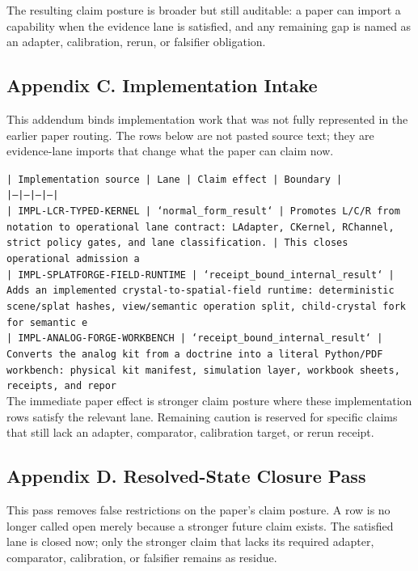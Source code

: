 \documentclass[11pt]{article}
\begin{document}
The resulting claim posture is broader but still auditable: a paper can import a capability when the evidence lane is satisfied, and any remaining gap is named as an adapter, calibration, rerun, or falsifier obligation.

\subsection*{Appendix C. Implementation Intake}

This addendum binds implementation work that was not fully represented in the earlier paper routing. The rows below are not pasted source text; they are evidence-lane imports that change what the paper can claim now.

\noindent\texttt{| Implementation source | Lane | Claim effect | Boundary |}\\
\noindent\texttt{|---|---|---|---|}\\
\noindent\texttt{| IMPL-LCR-TYPED-KERNEL | `normal\_form\_result` | Promotes L/C/R from notation to operational lane contract: LAdapter, CKernel, RChannel, strict policy gates, and lane classification. | This closes operational admission a}\\
\noindent\texttt{| IMPL-SPLATFORGE-FIELD-RUNTIME | `receipt\_bound\_internal\_result` | Adds an implemented crystal-to-spatial-field runtime: deterministic scene/splat hashes, view/semantic operation split, child-crystal fork for semantic e}\\
\noindent\texttt{| IMPL-ANALOG-FORGE-WORKBENCH | `receipt\_bound\_internal\_result` | Converts the analog kit from a doctrine into a literal Python/PDF workbench: physical kit manifest, simulation layer, workbook sheets, receipts, and repor}\\

The immediate paper effect is stronger claim posture where these implementation rows satisfy the relevant lane. Remaining caution is reserved for specific claims that still lack an adapter, comparator, calibration target, or rerun receipt.

\subsection*{Appendix D. Resolved-State Closure Pass}

This pass removes false restrictions on the paper's claim posture. A row is no longer called open merely because a stronger future claim exists. The satisfied lane is closed now; only the stronger claim that lacks its required adapter, comparator, calibration, or falsifier remains as residue.
\end{document}
